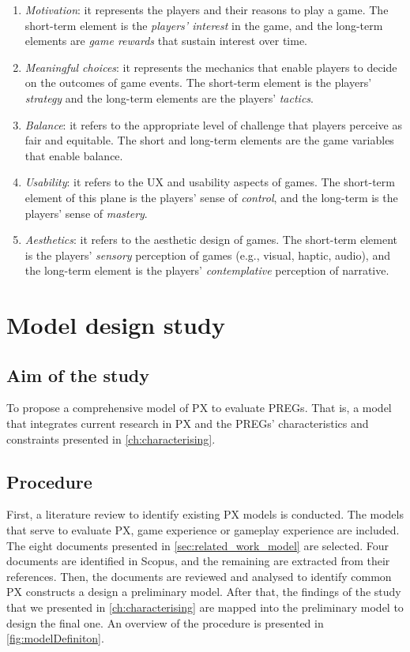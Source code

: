 \begin{enumerate}
    \item \emph{Motivation}: it represents the players and their reasons to play a game. The short-term element is the \textit{players' interest} in the game, and the long-term elements are \textit{game rewards} that sustain interest over time.
    \item \emph{Meaningful choices}: it represents the mechanics that enable players to decide on the outcomes of game events. The short-term element is the players' \textit{strategy} and the long-term elements are the players' \textit{tactics}.
    \item \emph{Balance}: it refers to the appropriate level of challenge that players perceive as fair and equitable. The short and long-term elements are the game variables that enable balance.
    \item \emph{Usability}: it refers to the \ac{UX} and usability aspects of games. The short-term element of this plane is the players' sense of \textit{control}, and the long-term is the players' sense of \textit{mastery}.
    \item \emph{Aesthetics}: it refers to the aesthetic design of games. The short-term element is the players' \textit{sensory} perception of games (e.g., visual, haptic, audio), and the long-term element is the players' \textit{contemplative} perception of narrative.
\end{enumerate}

\section{Model design study} %
\label{sec:model_design}
\subsection{Aim of the study}
To propose a comprehensive model of \ac{PX} to evaluate \acp{PREG}. That is, a model that integrates current research in \ac{PX} and the \acp{PREG}' characteristics and constraints presented in \autoref{ch:characterising}.

\subsection{Procedure}
First, a literature review to identify existing \ac{PX} models is conducted. The models that serve to evaluate \ac{PX}, game experience or gameplay experience are included. The eight documents presented in \autoref{sec:related_work_model} are selected. Four documents are identified in Scopus, and the remaining are extracted from their references. Then, the documents are reviewed and analysed to identify common \ac{PX} constructs a design a preliminary model. After that, the findings of the study that we presented in \autoref{ch:characterising} are mapped into the preliminary model to design the final one. An overview of the procedure is presented in \autoref{fig:modelDefiniton}.


